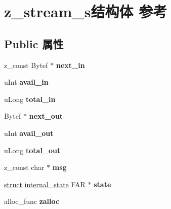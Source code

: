 \hypertarget{structz__stream__s}{}\section{z\+\_\+stream\+\_\+s结构体 参考}
\label{structz__stream__s}
\subsection*{Public 属性}
\begin{DoxyCompactItemize}
\item 
\mbox{\label{structz__stream__s_a71613678076af3a9a4bb28d51a146150}} 
z\+\_\+const Bytef $\ast$ {\bfseries next\+\_\+in}
\item 
\mbox{\label{structz__stream__s_a0cf177f50dbb49692f27480cbcfde794}} 
u\+Int {\bfseries avail\+\_\+in}
\item 
\mbox{\label{structz__stream__s_aa8f408b9632737dc21519fa1ed34b08d}} 
u\+Long {\bfseries total\+\_\+in}
\item 
\mbox{\label{structz__stream__s_a58f1e32c5e5e9860fc29267eab01c573}} 
Bytef $\ast$ {\bfseries next\+\_\+out}
\item 
\mbox{\label{structz__stream__s_a45ad2364307af9d944fd39d4eca3ca3c}} 
u\+Int {\bfseries avail\+\_\+out}
\item 
\mbox{\label{structz__stream__s_abae26f1f236cf920250b9d37fdf009c1}} 
u\+Long {\bfseries total\+\_\+out}
\item 
\mbox{\label{structz__stream__s_af116e1f45cb4399c0568b23b3e8b8c16}} 
z\+\_\+const char $\ast$ {\bfseries msg}
\item 
\mbox{\label{structz__stream__s_acad0cbe87a267f2321e95f6bf7752af3}} 
\hyperlink{interfacestruct}{struct} \hyperlink{structinternal__state}{internal\+\_\+state} F\+AR $\ast$ {\bfseries state}
\item 
\mbox{\label{structz__stream__s_a23a2299c384f808e76e9908f21216b0f}} 
alloc\+\_\+func {\bfseries zalloc}

\end{DoxyCompactItemize}
